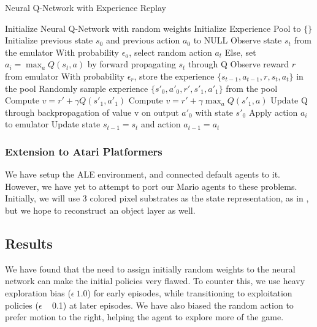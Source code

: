 \documentclass{article}
\begin{document}
\begin{algorithm}[tb]
   \caption{Neural Q-Network with Experience Replay}
   \label{alg:q-learn}
\begin{algorithmic}
   \STATE Initialize Neural Q-Network with random weights
   \STATE Initialize Experience Pool to $\{ \}$
   \STATE Initialize previous state $s_0$ and previous action $a_0$ to NULL
   \STATE Observe state $s_t$ from the emulator
   \STATE With probability $\epsilon_a$, select random action $a_t$
   \STATE Else, set $a_i = \max_a Q(s_t, a)$ by forward propagating $s_t$ through Q
   \STATE Observe reward $r$ from emulator
   \STATE With probability $\epsilon_r$, store the experience $\{s_{t-1}, a_{t-1}, r, s_t, a_t \}$ in the pool
   \ENDIF
   \STATE Randomly sample experience $\{s'_0, a'_0, r', s'_1, a'_1 \}$ from the pool
   \STATE Compute $v = r' + \gamma Q(s'_1, a'_1)$
   \ELSE
   \STATE Compute $v = r' + \gamma \max_a Q(s'_1, a)$
   \ENDIF
   \STATE Update Q through backpropagation of value v on output $a'_0$ with state $s'_0$
   \ENDFOR
   \STATE Apply action $a_i$ to emulator
   \STATE Update state $s_{t-1} = s_t$ and action $a_{t-1} = a_t$
   \ENDFOR
   \ENDFOR
\end{algorithmic}
\end{algorithm}

\subsubsection{Extension to Atari Platformers}
We have setup the ALE environment, and connected default agents to it. However, we have yet to attempt to port our Mario agents to these problems. Initially, we will use 3 colored pixel substrates as the state representation, as in \cite{Hauskneck13}, but we hope to reconstruct an object layer as well.
 
 \subsection{Results}
 
We have found that the need to assign initially random weights to the neural network can make the initial policies very flawed. To counter this, we use heavy exploration bias ($\epsilon ~ 1.0$) for early episodes, while transitioning to exploitation policies ($\epsilon$ ~ 0.1) at later episodes. We have also biased the random action to prefer motion to the right, helping the agent to explore more of the game.
 
\end{document}
